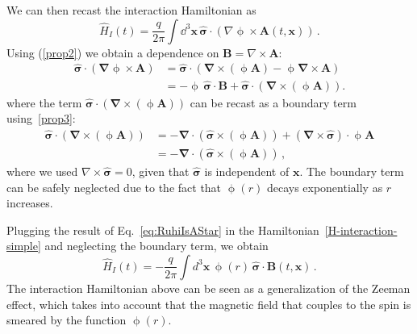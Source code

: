 \documentclass[letterpaper,12pt,titlepage,oneside,final]{book}
\begin{document}
We can then recast the interaction Hamiltonian as
\begin{equation}
    \hat{H}_I(t) = \frac{q}{2\pi} \int \dd^3\bm x\, \hat{\bm{\sigma}}\cdot(\nabla\upphi\times \bm{A}(t, \bm{x}))\, .
\end{equation}
Using (\ref{prop2}) we obtain a dependence on $\bm B = \nabla\times \bm A$:
\begin{align}
    \hat{\bm{\sigma}}\cdot(\bm{\nabla}\upphi \times \bm{A})&=  \hat{\bm{\sigma}}\cdot(\bm{\nabla}\times(\upphi\bm{A}) - \upphi\bm{\nabla}\times \bm{A})\nonumber\\
    &= - \upphi\,\hat{\bm{\sigma}}\cdot\bm{B} +  \hat{\bm{\sigma}}\cdot(\bm{\nabla} \times (\upphi\bm{A})).\label{eq:RuhiIsAStar}
\end{align}
where the term $\hat{\bm{\sigma}}\cdot(\bm{\nabla} \times (\upphi\bm{A}))$ can be recast as a boundary term using~\eqref{prop3}:
\begin{align}
    \hat{\bm{\sigma}}\cdot(\bm{\nabla} \times (\upphi\bm{A})) &=   - \bm{\nabla}\cdot(\hat{\bm{\sigma}} \times (\upphi\bm{A})) + (\bm{\nabla}\times\hat{\bm{\sigma}})\cdot \upphi\bm{A}\nonumber\\    
    &=  - \bm{\nabla}\cdot(\hat{\bm{\sigma}} \times (\upphi\bm{A})) \, ,
\end{align}
where we used $\nabla\times\hat{\bm \sigma} = 0$, given that $\hat{\bm \sigma}$ is independent of $\bm x$. The boundary term can be safely neglected due to the fact that $\upphi(r)$ decays exponentially as $r$ increases. 

Plugging the result of Eq.~\eqref{eq:RuhiIsAStar} in the Hamiltonian~\eqref{H-interaction-simple} and neglecting the boundary term, we obtain
\begin{equation}\label{H-interaction-zeeman}
    \hat{H}_I(t) = - \frac{q}{2\pi} \int d^3\bm x\, \upphi(r)\, \hat{\bm{\sigma}}\cdot\bm{B}(t, \bm{x})\, .
\end{equation}
The interaction Hamiltonian above can be seen as a generalization of the Zeeman effect, which takes into account that the magnetic field that couples to the spin is smeared by the function $\upphi(r)$.
\end{document}
